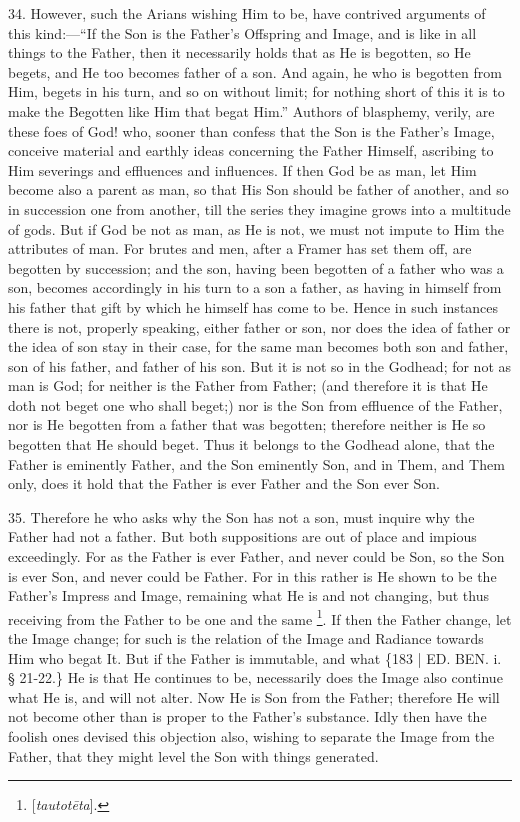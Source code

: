 34. However, such the Arians
wishing Him to be, have contrived arguments of this kind:—``If the
Son is the Father's Offspring and Image, and is like in all things to
the Father, then it necessarily holds that as He is begotten, so He
begets, and He too becomes father of a son. And again, he who is
begotten from Him, begets in his turn, and so on without limit; for
nothing short of this it is to make the Begotten like Him that begat
Him.'' Authors of blasphemy, verily, are these foes of God! who, sooner
than confess that the Son is the Father's Image, conceive material and
earthly ideas concerning the Father Himself, ascribing to Him
severings and effluences and influences. If then God be as man, let
Him become also a parent as man, so that His Son should be
father of another, and so in succession one from another, till the
series they imagine grows into a multitude of gods. But if God be not
as man, as He is not, we must not impute to Him the attributes of man.
For brutes and men, after a Framer has set them off, are begotten by
succession; and the son, having been begotten of a father who was a
son, becomes accordingly in his turn to a son a father, as having in
himself from his father that gift by which he himself has come to be.
Hence in such instances there is not, properly speaking, either father
or son, nor does the idea of father or the idea of son stay in their
case, for the same man becomes both son and father, son of his father,
and father of his son. But it is not so in the Godhead; for not as man
is God; for neither is the Father from Father; (and therefore it is
that He doth not beget one who shall beget;) nor is the Son from
effluence of the Father, nor is He begotten from a father that was
begotten; therefore neither is He so begotten that He should beget.
Thus it belongs to the Godhead alone, that the Father is eminently
Father, and the Son eminently Son, and in Them, and Them only, does it
hold that the Father is ever Father and the Son ever Son.

35. Therefore he who asks why
the Son has not a son, must inquire why the Father had not a father.
But both suppositions are out of place and impious exceedingly. For as
the Father is ever Father, and never could be Son, so the Son is ever
Son, and never could be Father. For in this rather is He shown to be
the Father's Impress and Image, remaining what He is and not changing,
but thus receiving from the Father to be one and the same \footnote{[\emph{tautot\={e}ta}].}. If then the Father change, let the Image change; for such is
the relation of the Image and Radiance towards Him who begat It. But
if the Father is immutable, and what \{183 | ED. BEN.
i. § 21-22.\} He is that He continues to be, necessarily does the
Image also continue what He is, and will not alter. Now He is Son from
the Father; therefore He will not become other than is proper to the
Father's substance. Idly then have the foolish ones devised this
objection also, wishing to separate the Image from the Father, that
they might level the Son with things generated.


